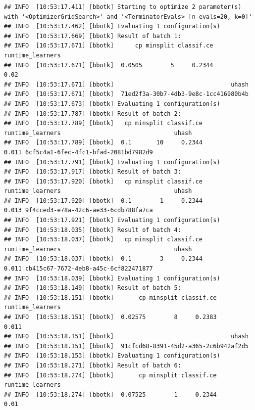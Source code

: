 \documentclass[
]{scrbook}
\newenvironment{Shaded}{\begin{snugshade}}{\end{snugshade}}
\newcommand{\FunctionTok}[1]{\textcolor[rgb]{0.00,0.00,0.00}{#1}}
\newcommand{\NormalTok}[1]{#1}
\newcommand{\SpecialCharTok}[1]{\textcolor[rgb]{0.00,0.00,0.00}{#1}}
\renewenvironment{Shaded} {\begin{snugshade}\small} {\end{snugshade}}
\begin{document}
\begin{Shaded}
\end{Shaded}

\begin{verbatim}
## INFO  [10:53:17.411] [bbotk] Starting to optimize 2 parameter(s) with '<OptimizerGridSearch>' and '<TerminatorEvals> [n_evals=20, k=0]' 
## INFO  [10:53:17.462] [bbotk] Evaluating 1 configuration(s) 
## INFO  [10:53:17.669] [bbotk] Result of batch 1: 
## INFO  [10:53:17.671] [bbotk]      cp minsplit classif.ce runtime_learners 
## INFO  [10:53:17.671] [bbotk]  0.0505        5     0.2344             0.02 
## INFO  [10:53:17.671] [bbotk]                                 uhash 
## INFO  [10:53:17.671] [bbotk]  71ed2f3a-30b7-4db3-9e8c-1cc416980b4b 
## INFO  [10:53:17.673] [bbotk] Evaluating 1 configuration(s) 
## INFO  [10:53:17.787] [bbotk] Result of batch 2: 
## INFO  [10:53:17.789] [bbotk]   cp minsplit classif.ce runtime_learners                                uhash 
## INFO  [10:53:17.789] [bbotk]  0.1       10     0.2344            0.011 6cf5c4a1-6fec-4fc1-bfad-2081bd7982d9 
## INFO  [10:53:17.791] [bbotk] Evaluating 1 configuration(s) 
## INFO  [10:53:17.917] [bbotk] Result of batch 3: 
## INFO  [10:53:17.920] [bbotk]   cp minsplit classif.ce runtime_learners                                uhash 
## INFO  [10:53:17.920] [bbotk]  0.1        1     0.2344            0.013 9f4cced3-e78a-42c6-ae33-6cdb788fa7ca 
## INFO  [10:53:17.921] [bbotk] Evaluating 1 configuration(s) 
## INFO  [10:53:18.035] [bbotk] Result of batch 4: 
## INFO  [10:53:18.037] [bbotk]   cp minsplit classif.ce runtime_learners                                uhash 
## INFO  [10:53:18.037] [bbotk]  0.1        3     0.2344            0.011 cb415c67-7672-4eb8-a45c-6cf822471877 
## INFO  [10:53:18.039] [bbotk] Evaluating 1 configuration(s) 
## INFO  [10:53:18.149] [bbotk] Result of batch 5: 
## INFO  [10:53:18.151] [bbotk]       cp minsplit classif.ce runtime_learners 
## INFO  [10:53:18.151] [bbotk]  0.02575        8     0.2383            0.011 
## INFO  [10:53:18.151] [bbotk]                                 uhash 
## INFO  [10:53:18.151] [bbotk]  91cfcd68-8391-45d2-a365-2c6b942af2d5 
## INFO  [10:53:18.153] [bbotk] Evaluating 1 configuration(s) 
## INFO  [10:53:18.271] [bbotk] Result of batch 6: 
## INFO  [10:53:18.274] [bbotk]       cp minsplit classif.ce runtime_learners 
## INFO  [10:53:18.274] [bbotk]  0.07525        1     0.2344             0.01 

\end{verbatim}
\end{document}

